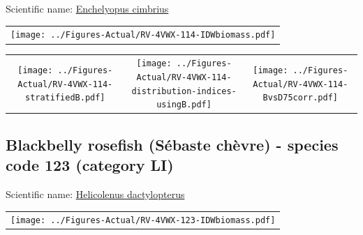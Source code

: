 \documentclass[12pt]{article}\usepackage[]{graphicx}\usepackage[]{color}
\begin{document}
  


Scientific name: \href{http://www.marinespecies.org/aphia.php?p=taxdetails\&id=126450}{Enchelyopus cimbrius} \newline
\begin{minipage}{1.0\textwidth}
 \begin{tabular}{c}
\texttt{[image: ../Figures-Actual/RV-4VWX-114-IDWbiomass.pdf]} \\ 
\end{tabular} 
\end{minipage}
\newline

\vspace{1cm}
\begin{minipage}{1.0\textwidth}
 \begin{tabular}{ccc}
\texttt{[image: ../Figures-Actual/RV-4VWX-114-stratifiedB.pdf]} & 
\texttt{[image: ../Figures-Actual/RV-4VWX-114-distribution-indices-usingB.pdf]} & 
\texttt{[image: ../Figures-Actual/RV-4VWX-114-BvsD75corr.pdf]} \\ 
\end{tabular} 
\end{minipage}
\clearpage

\renewcommand\thefigure{\thesubsection\Alph{figure}}

\setcounter{figure}{0}

\hypertarget{sec:123}{%
\subsection{Blackbelly rosefish (Sébaste chèvre) - species code 123 (category LI)}\label{sec:123}}

  


Scientific name: \href{http://www.marinespecies.org/aphia.php?p=taxdetails\&id=127251}{Helicolenus dactylopterus} \newline
\begin{minipage}{1.0\textwidth}
 \begin{tabular}{c}
\texttt{[image: ../Figures-Actual/RV-4VWX-123-IDWbiomass.pdf]} \\ 
\end{tabular} 
\end{minipage}
\newline
\end{document}
